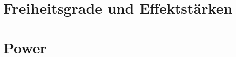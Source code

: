 \documentclass[handout,aspectratio=1610,dvipsnames]{beamer}
\begin{document}
  \section{Freiheitsgrade und Effektstärken}
  \let\woopsi\section\let\section\subsection\let\subsection\subsubsection
  
  \let\subsection\section\let\section\woopsi

  \section{Power}
  \let\woopsi\section\let\section\subsection\let\subsection\subsubsection
  
  \let\subsection\section\let\section\woopsi
\end{document}
